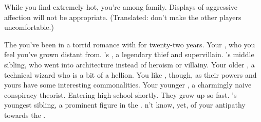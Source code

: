\documentclass[char]{LRSguildcamp1}
\begin{document}
\begin{itemz}[Notes]
	\item While you find \cOldest{} extremely hot, you're among family.  Displays of aggressive affection will not be appropriate.  (Translated: don't make the other players uncomfortable.)
\end{itemz}

\begin{contacts}
	\contact{\cOldest{}}  The \cOldest{\villain} you've been in a torrid romance with for twenty-two years.
	\contact{\cGrad{}} Your \cGrad{\offspring}, who you feel you've grown distant from.
	\contact{\cGrandma{}} \cOldest{}'s \cGrandma{\parent}, a legendary thief and supervillain.
	\contact{\cArchitect{}} \cOldest{}'s middle sibling, who went into architecture instead of heroism or villainy. 
	\contact{\cTeen{}} Your older \cTeen{\nephew}, a technical wizard who is a bit of a hellion.  You like \cTeen{\them}, though, as their powers and yours have some interesting commonalities.
	\contact{\cTween{}} Your younger \cTween{\nephew}, a charmingly naive conspiracy theorist.  Entering high school shortly.  They grow up so fast.
	\contact{\cYoungest{}} \cOldest{}'s youngest sibling, a prominent figure in the \cHeroLeague{\intro}.  \cYoungest{\They} \cYoungest{\do}n't know, yet, of your antipathy towards the \cHeroLeague{}.
\end{contacts}
\end{document}
